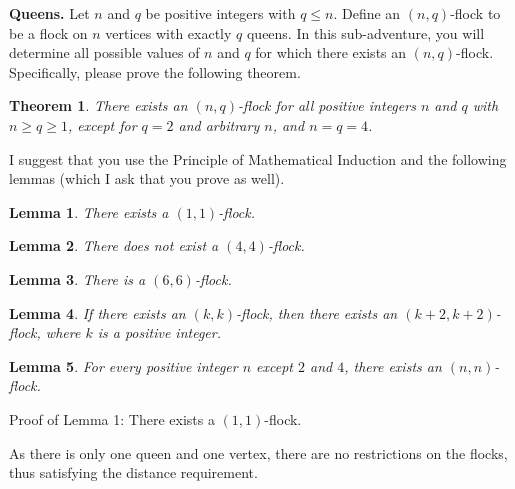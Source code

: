 \documentclass[answers]{exam}
\newtheorem{theorem}{Theorem}
\newtheorem{lemma}{Lemma}
\begin{document}
	\begin{questions}
		\question 
		{\bf Queens.}  
		Let $n$ and $q$ be positive integers with $q \leq n$.  
		Define an $(n,q)$-flock to be a flock on $n$ vertices with exactly $q$ queens.
		In this sub-adventure, you will determine all possible values of $n$ and $q$ for which there exists an $(n,q)$-flock.
		Specifically, please prove the following theorem.\\
		
		\begin{theorem}There exists an $(n,q)$-flock for all positive integers $n$ and $q$ with $n \geq q \geq 1$, except for 
			$q = 2$ and arbitrary $n$, and $n = q = 4$.
		\end{theorem}
		
		\noindent I suggest that you use the Principle of Mathematical Induction and the following lemmas (which I ask that you prove as well).\\
		
		\begin{lemma}
			There exists a $(1,1)$-flock.
		\end{lemma}
		
		
		\begin{lemma}
			There does not exist a $(4,4)$-flock.
		\end{lemma}
		
		
		\begin{lemma}
			There is a $(6,6)$-flock.
		\end{lemma}
		
		
		\begin{lemma}
			If there exists an $(k,k)$-flock, then there exists an $(k+2, k+2)$-flock, where $k$ is a positive integer.
		\end{lemma}
		
		
		\begin{lemma}
			For every positive integer $n$ except $2$ and $4$, there exists an $(n,n)$-flock.
		\end{lemma}
		
		
		
		\begin{solution}

            Proof of Lemma 1: There exists a $(1,1)$-flock.
            
            As there is only one queen and one vertex, there are no restrictions on the flocks, thus satisfying the distance requirement.
            \\\\


\end{solution}
\end{questions}
\end{document}
